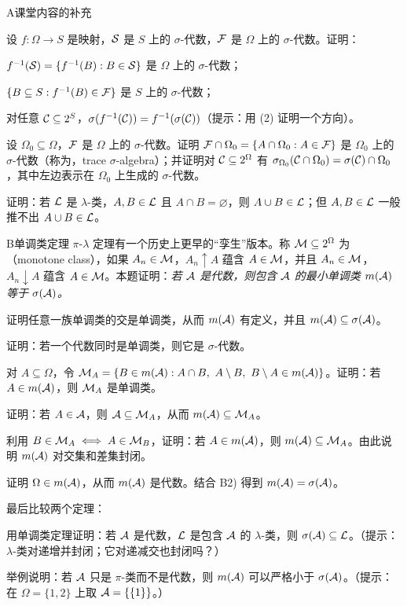 \begin{exercises}{A}{课堂内容的补充}
\item 设 $f:\Omega\to S$ 是映射，$\mathcal{S}$ 是 $S$ 上的 $\sigma$-代数，$\mathcal{F}$ 是 $\Omega$ 上的 $\sigma$-代数。证明：
\begin{questions}
\item $f^{-1}(\mathcal{S})=\{f^{-1}(B): B\in\mathcal{S}\}$ 是 $\Omega$ 上的 $\sigma$-代数；
\item $\{B\subseteq S: f^{-1}(B)\in\mathcal{F}\}$ 是 $S$ 上的 $\sigma$-代数；
\item 对任意 $\mathcal{C}\subseteq2^S$，$\sigma(f^{-1}(\mathcal{C}))=f^{-1}(\sigma(\mathcal{C}))$（提示：用 (2) 证明一个方向）。
\end{questions}
\item 设 $\Omega_0\subseteq\Omega$，$\mathcal{F}$ 是 $\Omega$ 上的 $\sigma$-代数。证明 $\mathcal{F}\cap\Omega_0=\{A\cap\Omega_0: A\in\mathcal{F}\}$ 是 $\Omega_0$ 上的 $\sigma$-代数（称为，trace $\sigma$-algebra）；并证明对 $\mathcal{C}\subseteq2^\Omega$ 有 $\sigma_{\Omega_0}(\mathcal{C}\cap\Omega_0)=\sigma(\mathcal{C})\cap\Omega_0$，其中左边表示在 $\Omega_0$ 上生成的 $\sigma$-代数。
\item 证明：若 $\mathcal{L}$ 是 $\lambda$-类，$A,B\in\mathcal{L}$ 且 $A\cap B=\varnothing$，则 $A\cup B\in\mathcal{L}$；但 $A,B\in\mathcal{L}$ 一般推不出 $A\cup B\in\mathcal{L}$。
\end{exercises}

\begin{probleme}{B}{单调类定理}
$\pi$-$\lambda$ 定理有一个历史上更早的“孪生”版本。称 $\mathcal{M}\subseteq2^\Omega$ 为（monotone class），如果 $A_n\in\mathcal{M}$，$A_n\uparrow A$ 蕴含 $A\in\mathcal{M}$，并且 $A_n\in\mathcal{M}$，$A_n\downarrow A$ 蕴含 $A\in\mathcal{M}$。本题证明：\emph{若 $\mathcal{A}$ 是代数，则包含 $\mathcal{A}$ 的最小单调类 $m(\mathcal{A})$ 等于 $\sigma(\mathcal{A})$。}
\begin{questions}
\item 证明任意一族单调类的交是单调类，从而 $m(\mathcal{A})$ 有定义，并且 $m(\mathcal{A})\subseteq\sigma(\mathcal{A})$。
\item 证明：若一个代数同时是单调类，则它是 $\sigma$-代数。
\item 对 $A\subseteq\Omega$，令 $\cM_A=\{B\in m(\cA): A\cap B,\ A\setminus B,\ B\setminus A\in m(\cA)\}$。证明：若 $A\in m(\mathcal{A})$，则 $\mathcal{M}_A$ 是单调类。
\item 证明：若 $A\in\mathcal{A}$，则 $\mathcal{A}\subseteq\mathcal{M}_A$，从而 $m(\mathcal{A})\subseteq\mathcal{M}_A$。
\item 利用 $B\in\mathcal{M}_A\iff A\in\mathcal{M}_B$，证明：若 $A\in m(\mathcal{A})$，则 $m(\mathcal{A})\subseteq\mathcal{M}_A$。由此说明 $m(\mathcal{A})$ 对交集和差集封闭。
\item 证明 $\Omega\in m(\mathcal{A})$，从而 $m(\mathcal{A})$ 是代数。结合 B2) 得到 $m(\mathcal{A})=\sigma(\mathcal{A})$。
\end{questions}
最后比较两个定理：
\begin{questions}[resume]
\item 用单调类定理证明：若 $\mathcal{A}$ 是代数，$\mathcal{L}$ 是包含 $\mathcal{A}$ 的 $\lambda$-类，则 $\sigma(\mathcal{A})\subseteq\mathcal{L}$。（提示：$\lambda$-类对递增并封闭；它对递减交也封闭吗？）
\item 举例说明：若 $\mathcal{A}$ 只是 $\pi$-类而不是代数，则 $m(\mathcal{A})$ 可以严格小于 $\sigma(\mathcal{A})$。（提示：在 $\Omega=\{1,2\}$ 上取 $\mathcal{A}=\{\{1\}\}$。）
\end{questions}
\end{probleme}

